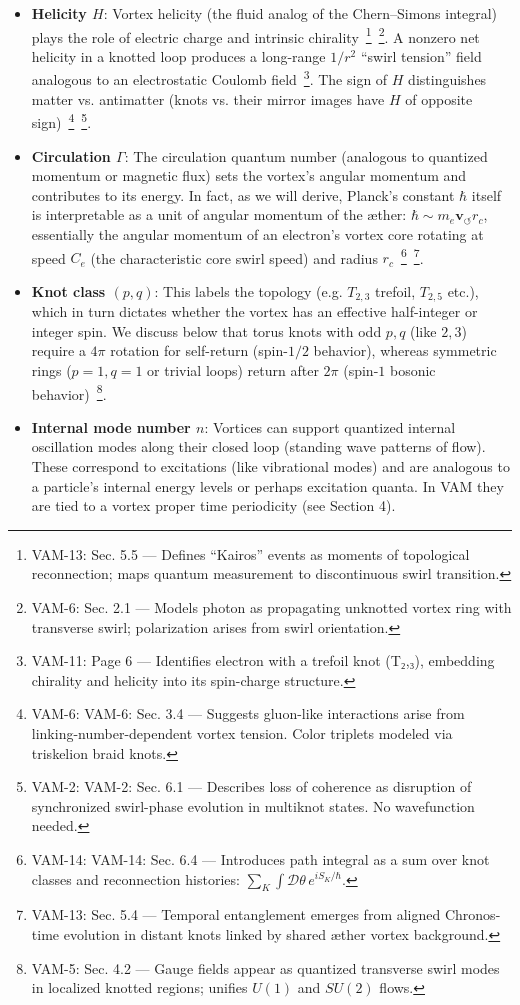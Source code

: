 \documentclass[a4paper,12pt]{article}
\begin{document}
    \begin{itemize}
        \item \textbf{Helicity $H$}: Vortex helicity (the fluid analog of the Chern–Simons integral) plays the role of electric charge and intrinsic chirality~\footnote{VAM-13: Sec. 5.5 — Defines “Kairos” events as moments of topological reconnection; maps quantum measurement to discontinuous swirl transition.}~\footnote{VAM-6: Sec. 2.1 — Models photon as propagating unknotted vortex ring with transverse swirl; polarization arises from swirl orientation.}. A nonzero net helicity in a knotted loop produces a long-range $1/r^2$ “swirl tension” field analogous to an electrostatic Coulomb field~\footnote{VAM-11: Page 6 — Identifies electron with a trefoil knot (T₂,₃), embedding chirality and helicity into its spin-charge structure.}. The sign of $H$ distinguishes matter vs. antimatter (knots vs. their mirror images have $H$ of opposite sign)~\footnote{VAM-6: VAM-6: Sec. 3.4 — Suggests gluon-like interactions arise from linking-number-dependent vortex tension. Color triplets modeled via triskelion braid knots.}~\footnote{VAM-2: VAM-2: Sec. 6.1 — Describes loss of coherence as disruption of synchronized swirl-phase evolution in multiknot states. No wavefunction needed.}.
        \item \textbf{Circulation $\Gamma$}: The circulation quantum number (analogous to quantized momentum or magnetic flux) sets the vortex’s angular momentum and contributes to its energy. In fact, as we will derive, Planck’s constant $\hbar$ itself is interpretable as a unit of angular momentum of the æther: $\hbar \sim m_e \mathbf{v}_{\scriptscriptstyle\boldsymbol{\circlearrowleft}} r_c$, essentially the angular momentum of an electron’s vortex core rotating at speed $C_e$ (the characteristic core swirl speed) and radius $r_c$~\footnote{VAM-14: VAM-14: Sec. 6.4 — Introduces path integral as a sum over knot classes and reconnection histories: $\sum_{K} \int \mathcal{D}\theta\, e^{iS_K/\hbar}$.}~\footnote{VAM-13: Sec. 5.4 — Temporal entanglement emerges from aligned Chronos-time evolution in distant knots linked by shared æther vortex background.}.
        \item \textbf{Knot class $(p,q)$}: This labels the topology (e.g. $T_{2,3}$ trefoil, $T_{2,5}$ etc.), which in turn dictates whether the vortex has an effective half-integer or integer spin. We discuss below that torus knots with odd $p,q$ (like $2,3$) require a $4\pi$ rotation for self-return (spin-$1/2$ behavior), whereas symmetric rings ($p=1,q=1$ or trivial loops) return after $2\pi$ (spin-$1$ bosonic behavior)~\footnote{VAM-5: Sec. 4.2 — Gauge fields appear as quantized transverse swirl modes in localized knotted regions; unifies $U(1)$ and $SU(2)$ flows.}.
        \item \textbf{Internal mode number $n$}: Vortices can support quantized internal oscillation modes along their closed loop (standing wave patterns of flow). These correspond to excitations (like vibrational modes) and are analogous to a particle’s internal energy levels or perhaps excitation quanta. In VAM they are tied to a vortex proper time periodicity (see Section 4).
    \end{itemize}
\end{document}
